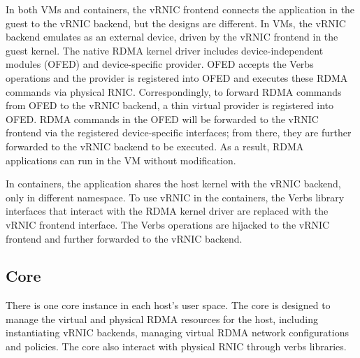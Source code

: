 
In both VMs and containers, the vRNIC frontend connects the application in the guest to the vRNIC backend, but the designs are different. In VMs, the vRNIC backend emulates as an external device, driven by the vRNIC frontend in the guest kernel. The native RDMA kernel driver includes device-independent modules (OFED) and device-specific provider. OFED accepts the Verbs operations and the provider is registered into OFED and executes these RDMA commands via physical RNIC. Correspondingly, to forward RDMA commands from OFED to the vRNIC backend, a thin virtual provider is registered into OFED. RDMA commands in the OFED will be forwarded to the vRNIC frontend via the registered device-specific interfaces; from there, they are further forwarded to the vRNIC backend to be executed. As a result, RDMA applications can run in the VM without modification. 

In containers, the application shares the host kernel with the vRNIC backend, only in different namespace. To use vRNIC in the containers, the Verbs library interfaces that interact with the RDMA kernel driver are replaced with the vRNIC frontend interface. The Verbs operations are hijacked to the vRNIC frontend and further forwarded to the vRNIC backend.

\subsection{\sys Core}

There is one \sys core instance in each host's user space. The \sys core is designed to manage the virtual and physical RDMA resources for the host, including instantiating vRNIC backends, managing virtual RDMA network configurations and policies. The \sys core also interact with physical RNIC through verbs libraries.

